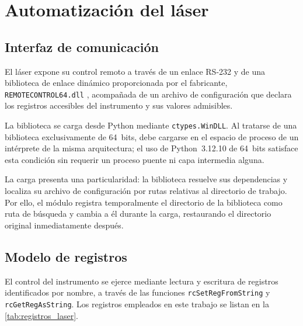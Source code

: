 \section{Automatización del láser}
\label{sec:auto_laser}

\subsection*{Interfaz de comunicación}

El láser expone su control remoto a través de un enlace RS-232 y de
una biblioteca de enlace dinámico proporcionada por el fabricante,
\texttt{REMOTECONTROL64.dll} \cite{EksplaRemote}, acompañada de un archivo de
configuración que declara los registros accesibles del instrumento y
sus valores admisibles.

La biblioteca se carga desde Python mediante \texttt{ctypes.WinDLL}.
Al tratarse de una biblioteca exclusivamente de 64~bits, debe
cargarse en el espacio de proceso de un intérprete de la misma
arquitectura; el uso de Python~3.12.10 de 64~bits satisface esta
condición sin requerir un proceso puente ni capa intermedia alguna.

La carga presenta una particularidad: la biblioteca resuelve sus
dependencias y localiza su archivo de configuración por rutas
relativas al directorio de trabajo. Por ello, el módulo registra
temporalmente el directorio de la biblioteca como ruta de búsqueda y
cambia a él durante la carga, restaurando el directorio original
inmediatamente después.

\subsection*{Modelo de registros}

El control del instrumento se ejerce mediante lectura y escritura de
registros identificados por nombre, a través de las funciones
\texttt{rcSetRegFromString} y \texttt{rcGetRegAsString}. Los
registros empleados en este trabajo se listan en la
\cref{tab:registros_laser}.

